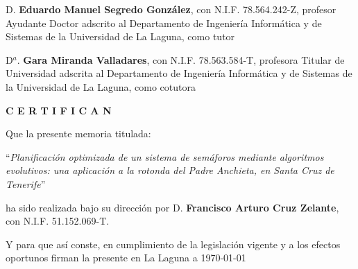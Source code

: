 \documentclass[spanish,a4paper,12pt,oneside,notitlepage]{extreport}
\begin{document}

\newpage
\thispagestyle{empty}

\bigskip
D. {\bf Eduardo Manuel Segredo González}, con N.I.F. 78.564.242-Z, profesor Ayudante Doctor adscrito al Departamento de Ingeniería Informática y de Sistemas de la Universidad de La Laguna, como tutor

\bigskip
D${}^a$. {\bf Gara Miranda Valladares}, con N.I.F. 78.563.584-T, profesora Titular de Universidad adscrita al Departamento de Ingeniería Informática y de Sistemas de la Universidad de La Laguna, como cotutora\pagestyle{empty}

\bigskip
\bigskip
\bigskip
{\bf C E R T I F I C A N}

\bigskip
\bigskip
Que la presente memoria titulada:

\bigskip
``{\it Planificación optimizada de un sistema de semáforos mediante algoritmos evolutivos: una aplicación a la rotonda del Padre Anchieta, en Santa Cruz de Tenerife}''

\bigskip
\bigskip
\bigskip

\noindent ha sido realizada bajo su dirección por D. {\bf Francisco Arturo Cruz Zelante},
con N.I.F. 51.152.069-T.

\bigskip
\bigskip

Y para que así conste, en cumplimiento de la legislación vigente y a los efectos
oportunos firman la presente en La Laguna a \today

\newpage{\pagestyle{empty}}
\thispagestyle{empty}


\renewcommand{\thepage}{\roman{page}}
\setcounter{page}{1}

\newpage{\pagestyle{empty}}
\thispagestyle{empty}


\newpage{\pagestyle{empty}}
\thispagestyle{empty}

\end{document}
